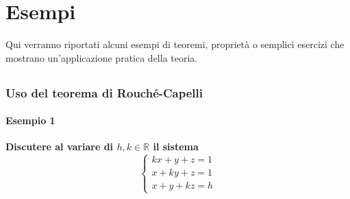 
\section{Esempi}%
\label{sec:esempi}

Qui verranno riportati alcuni esempi di teoremi, proprietà o semplici esercizi che
mostrano un'applicazione pratica della teoria.

\subsection{}%

\subsection{}%

\subsubsection{Uso del teorema di Rouché-Capelli}%
\label{sub:uso_del_teorema_di_rouche_capelli}

\paragraph{Esempio 1}%
\textbf{Discutere al variare di $h,k\in\mathbb{R}$ il sistema}
\begin{equation*}
  \begin{cases}
    kx + y + z = 1\\
    x + ky + z = 1\\
    x + y + kz = h
  \end{cases}
\end{equation*}

